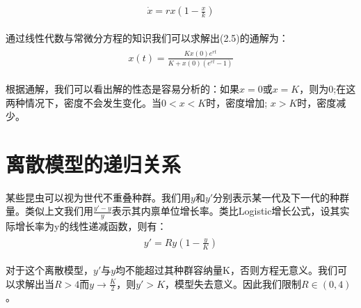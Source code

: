 	\begin{align}
		\begin{split}
		\label{eq:feedforward}
		\dot{x}=rx\left ( 1-\frac{x}{k} \right )
	\end{split}
	\end{align}

通过线性代数与常微分方程的知识我们可以求解出(2.5)的通解为：
\begin{align}
	\begin{split}
	\label{eq:feedforward}
	x(t)=\frac{Kx(0)e^{rt}}{K+x(0)(e^{rt}-1)}
	\end{split}
\end{align}

根据通解，我们可以看出解的性态是容易分析的：如果\begin{math}x=0\end{math}或\begin{math}x=K\end{math}，则为0;在这两种情况下，密度不会发生变化。当\begin{math}0<x<K\end{math}时，密度增加; \begin{math}x>K\end{math}时，密度减少。

\section{离散模型的递归关系}
某些昆虫可以视为世代不重叠种群。我们用\begin{math}y\end{math}和\begin{math}y'\end{math}分别表示某一代及下一代的种群量。类似上文我们用\begin{math}\frac{y'-y}{y}\end{math}表示其内禀单位增长率。类比Logistic增长公式，设其实际增长率为y的线性递减函数，则有：
	\begin{align}
		\begin{split}
		\label{eq:feedforward}
		y'=Ry\left (1- \frac{y}{K} \right )
		\end{split}
	\end{align}

对于这个离散模型，\begin{math}y'\end{math}与\begin{math}y\end{math}均不能超过其种群容纳量K，否则方程无意义。我们可以求解出当\begin{math}R>4\end{math}而\begin{math}y \to \frac{K}{2} \end{math}，则\begin{math}y'>K\end{math}，模型失去意义。因此我们限制\begin{math}R\in \left ( 0,4 \right )\end{math}。

